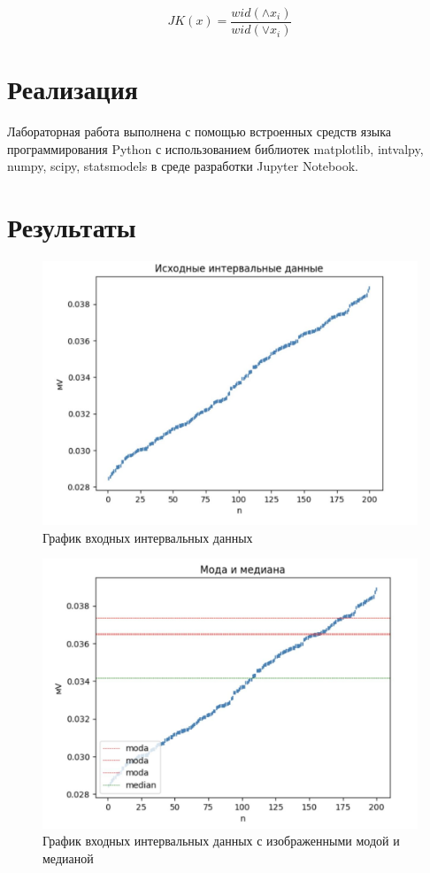 \documentclass[12pt,a4paper]{article}
\begin{document}
     \[  JK(x) = \frac{wid(\land x_i)}{wid(\lor x_i)}  \]
    
    
    \section{Реализация}
    Лабораторная работа выполнена с помощью встроенных средств языка программирования Python с использованием библиотек matplotlib, intvalpy, numpy, scipy, statsmodels в среде разработки Jupyter Notebook. 


    \section{Результаты}

    \begin{figure}[H]
        \centering
        \includegraphics[width=16cm]{3_1.png}
        \caption{График входных интервальных данных}
        \label{fig:box_z}
    \end{figure}

    \begin{figure}[H]
        \centering
        \includegraphics[width=16cm]{3_2.png}
        \caption{График входных интервальных данных с изображенными модой и медианой}
        \label{fig:box_z}
    \end{figure}
\end{document}
